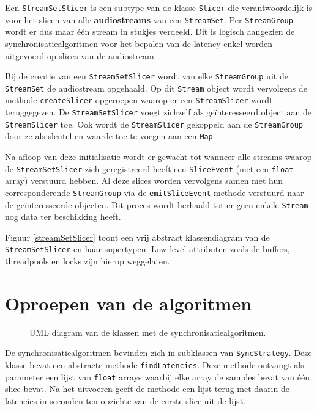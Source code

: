 Een \texttt{StreamSetSlicer} is een subtype van de klasse \texttt{Slicer} die verantwoordelijk is voor het slicen van alle \textbf{audiostreams} van een \texttt{StreamSet}. Per \texttt{StreamGroup} wordt er dus maar één stream in stukjes verdeeld. Dit is logisch aangezien de synchronisatiealgoritmen voor het bepalen van de latency enkel worden uitgevoerd op slices van de audiostream.

Bij de creatie van een \texttt{StreamSetSlicer} wordt van elke \texttt{StreamGroup} uit de \texttt{StreamSet} de audiostream opgehaald. Op dit \texttt{Stream} object wordt vervolgens de methode \texttt{createSlicer} opgeroepen waarop er een \texttt{StreamSlicer} wordt teruggegeven. De \texttt{StreamSetSlicer} voegt zichzelf als geïnteresseerd object aan de \texttt{StreamSlicer} toe. Ook wordt de \texttt{StreamSlicer}
gekoppeld aan de \texttt{StreamGroup} door ze als sleutel en waarde toe te voegen aan een \texttt{Map}.

Na afloop van deze initialisatie wordt er gewacht tot wanneer alle streams waarop de \texttt{StreamSetSlicer} zich geregistreerd heeft een \texttt{SliceEvent} (met een \texttt{float} array) verstuurd hebben. Al deze slices worden vervolgens samen met hun corresponderende \texttt{StreamGroup} via de \texttt{emitSliceEvent} methode verstuurd naar de geïnteresseerde objecten. Dit proces wordt herhaald tot er geen enkele \texttt{Stream} nog data ter beschikking heeft.

Figuur \ref{streamSetSlicer} toont een vrij abstract klassendiagram van de \texttt{StreamSetSlicer} en haar supertypen. Low-level attributen zoals de buffers, threadpools en locks zijn hierop weggelaten.

\section*{Oproepen van de algoritmen}

\begin{figure}[h!]
	\captionsetup{width=0.7\textwidth}
	\caption{UML diagram van de klassen met de synchronisatiealgoritmen.}
	\begin{center}
		\advance\parskip0.3cm
		
	\end{center}
	\label{SyncStrategyUML}
\end{figure}

De synchronisatiealgoritmen bevinden zich in subklassen van \texttt{SyncStrategy}. Deze klasse bevat een abstracte methode \texttt{findLatencies}. Deze methode ontvangt als parameter een lijst van \texttt{float} arrays waarbij elke array de samples bevat van één slice bevat. Na het uitvoeren geeft de methode een lijst terug met daarin de latencies in seconden ten opzichte van de eerste slice uit de lijst.

